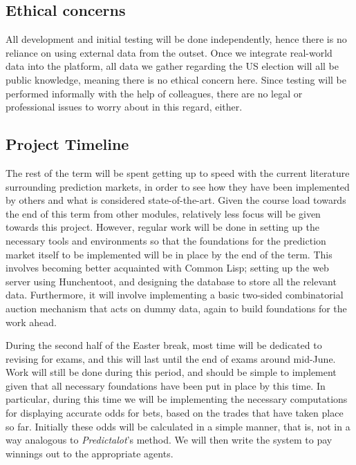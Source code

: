 \documentclass[10pt,a4paper]{article}
\theoremstyle{plain}
\theoremstyle{definition}
\begin{document}
	\subsection{Ethical concerns}

	All development and initial testing will be done independently, hence there
	is no reliance on using external data from the outset. Once we integrate
	real-world data into the platform, all data we gather regarding the US
	election will all be public knowledge, meaning there is no ethical concern
	here. Since testing will be performed informally with the help of
	colleagues, there are no legal or professional issues to worry about in
	this regard, either.

	\subsection{Project Timeline}

	The rest of the term will be spent getting up to speed with the current
	literature surrounding prediction markets, in order to see how they have
	been implemented by others and what is considered state-of-the-art. Given
	the course load towards the end of this term from other modules, relatively
	less focus will be given towards this project. However, regular work will
	be done in setting up the necessary tools and environments so that the
	foundations for the prediction market itself to be implemented will be in
	place by the end of the term. This involves becoming better acquainted with
	Common Lisp; setting up the web server using Hunchentoot, and designing the
	database to store all the relevant data. Furthermore, it will involve
	implementing a basic two-sided combinatorial auction mechanism that acts on
	dummy data, again to build foundations for the work ahead.

	During the second half of the Easter break, most time will be dedicated to
	revising for exams, and this will last until the end of exams around
	mid-June. Work will still be done during this period, and should be simple
	to implement given that all necessary foundations have been put in place by
	this time. In particular, during this time we will be implementing the
	necessary computations for displaying accurate odds for bets, based on the
	trades that have taken place so far. Initially these odds will be
	calculated in a simple manner, that is, not in a way analogous
	to \emph{Predictalot}'s method. We will then write the system to pay
	winnings out to the appropriate agents.
\end{document}
